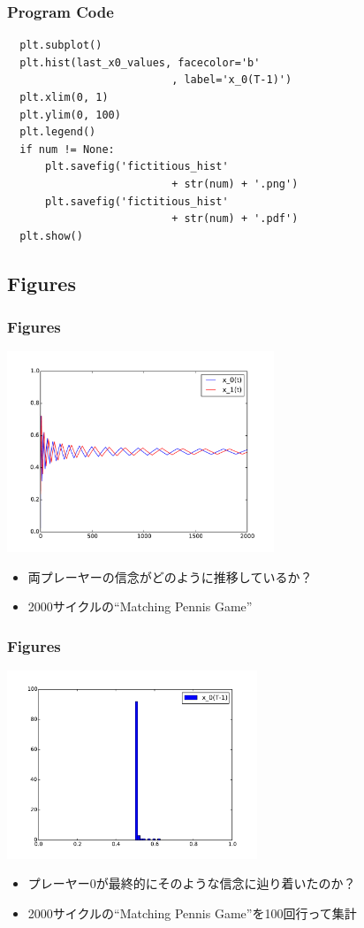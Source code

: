 \documentclass[dvipdfmx,11pt]{beamer}
\begin{document}
\begin{frame}[containsverbatim]\frametitle{Program Code}
 \begin{verbatim}
  plt.subplot()
  plt.hist(last_x0_values, facecolor='b'
                          , label='x_0(T-1)')
  plt.xlim(0, 1)
  plt.ylim(0, 100)
  plt.legend()
  if num != None:
      plt.savefig('fictitious_hist'
                          + str(num) + '.png')
      plt.savefig('fictitious_hist'
                          + str(num) + '.pdf')
  plt.show()
 \end{verbatim}
\end{frame}

\subsection{Figures}
\begin{frame}\frametitle{Figures}
 \begin{center}
  \includegraphics[width=8cm]{fictitious1.pdf}
 \end{center}
 \begin{itemize}
  \item 両プレーヤーの信念がどのように推移しているか？
  \item 2000サイクルの``Matching Pennis Game''
 \end{itemize}
\end{frame}

\begin{frame}\frametitle{Figures}
 \begin{center}
  \includegraphics[width=7.5cm]{fictitious_hist0.pdf}
 \end{center}
 \begin{itemize}
  \item プレーヤー0が最終的にそのような信念に辿り着いたのか？
  \item 2000サイクルの``Matching Pennis Game''を100回行って集計
 \end{itemize}
\end{frame}
\end{document}
